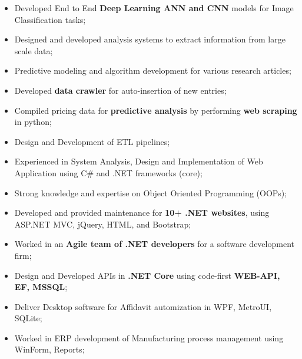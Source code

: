 \documentclass[10pt,a4paper]{altacv}
\begin{document}


%

\begin{fullwidth}
\makecvheader
\end{fullwidth}

%





\begin{itemize}
	\item Developed End to End \textbf{Deep Learning ANN and CNN} models for Image Classification tasks;
	\item Designed and developed analysis systems to extract information from large scale data;
	\item Predictive modeling and algorithm development for various research articles;
  \item Developed \textbf{data crawler} for auto-insertion of new entries;
	\item Compiled pricing data for \textbf{predictive analysis} by performing \textbf{web scraping} in python;
	\item Design and Development of ETL pipelines;
\end{itemize}

\divider
%


\begin{itemize}
	\item Experienced in System Analysis, Design and Implementation of Web Application using C\# and .NET frameworks (core);
	\item Strong knowledge and expertise on Object Oriented Programming (OOPs);
	\item Developed and provided maintenance for \textbf{10+ .NET websites}, using ASP.NET MVC, jQuery, HTML, and Bootstrap;
	\item Worked in an \textbf{Agile team of .NET developers} for a software development firm;
	\item Design and Developed APIs in \textbf{.NET Core} using code-first \textbf{WEB-API, EF, MSSQL};
	\item Deliver Desktop software for Affidavit automization in WPF, MetroUI, SQLite;
	\item Worked in ERP development of Manufacturing process management using WinForm, Reports;
\end{itemize}
\end{document}
